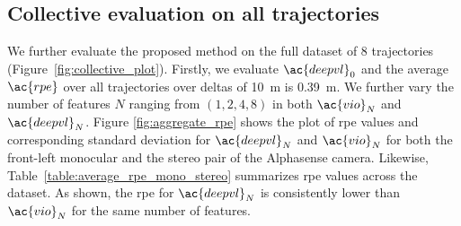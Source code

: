 \subsection{Collective evaluation on all trajectories}
We further evaluate the proposed method on the full dataset of $8$ trajectories (Figure~\ref{fig:collective_plot}). Firstly, we evaluate $\ac{deepvl}_{0}$ and the average $\ac{rpe}$ over all trajectories over deltas of \SI{10}{\meter} is \SI{0.39}{\meter}. We further vary the number of features $N$ ranging from $(1, 2, 4, 8)$ in both $\ac{vio}_{N}$ and $\ac{deepvl}_{N}$. Figure \ref{fig:aggregate_rpe} shows the plot of \ac{rpe} values and corresponding standard deviation for $\ac{deepvl}_{N}$ and $\ac{vio}_{N}$ for both the front-left monocular and the stereo pair of the Alphasense camera. Likewise, Table~\ref{table:average_rpe_mono_stereo} summarizes \ac{rpe} values across the dataset. As shown, the \ac{rpe} for $\ac{deepvl}_{N}$ is consistently lower than $\ac{vio}_{N}$ for the same number of features.

\begin{table}[]
\caption{Table presenting the average of the \ac{rpe} for varying visual features for monocular and stereo camera configuration. The symbol 'X' indicates that a method diverges. The \ac{rpe} was calculated over delta of \SI{10}{\meter}.}
\label{table:average_rpe_mono_stereo}
\end{table}

